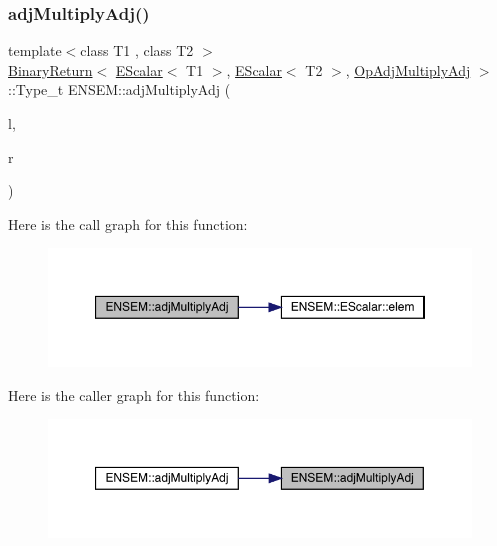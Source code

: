 \subsubsection{\texorpdfstring{adjMultiplyAdj()}{adjMultiplyAdj()}}
{\footnotesize\ttfamily template$<$class T1 , class T2 $>$ \\
\mbox{\hyperlink{structENSEM_1_1BinaryReturn}{Binary\+Return}}$<$ \mbox{\hyperlink{classENSEM_1_1EScalar}{E\+Scalar}}$<$ T1 $>$, \mbox{\hyperlink{classENSEM_1_1EScalar}{E\+Scalar}}$<$ T2 $>$, \mbox{\hyperlink{structENSEM_1_1OpAdjMultiplyAdj}{Op\+Adj\+Multiply\+Adj}} $>$\+::Type\+\_\+t E\+N\+S\+E\+M\+::adj\+Multiply\+Adj (\begin{DoxyParamCaption}\item[{const \mbox{\hyperlink{classENSEM_1_1EScalar}{E\+Scalar}}$<$ T1 $>$ \&}]{l,  }\item[{const \mbox{\hyperlink{classENSEM_1_1EScalar}{E\+Scalar}}$<$ T2 $>$ \&}]{r }\end{DoxyParamCaption})\hspace{0.3cm}{\ttfamily [inline]}}

Here is the call graph for this function\+:
\nopagebreak
\begin{figure}[H]
\begin{center}
\leavevmode
\includegraphics[width=350pt]{d4/dca/group__escalar_gab3c0c146aa415c32cb9ce5a6ad426d10_cgraph}
\end{center}
\end{figure}
Here is the caller graph for this function\+:
\nopagebreak
\begin{figure}[H]
\begin{center}
\leavevmode
\includegraphics[width=350pt]{d4/dca/group__escalar_gab3c0c146aa415c32cb9ce5a6ad426d10_icgraph}
\end{center}
\end{figure}
\mbox{\label{group__escalar_gab463bdb3f1fadf6b5a87076e5d3dc9b9}} 
